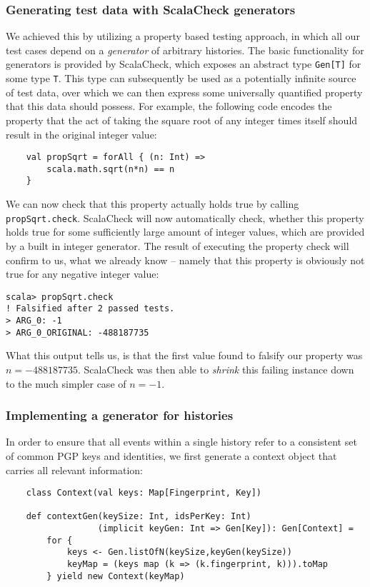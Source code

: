 \subsubsection{Generating test data with ScalaCheck generators}
We achieved this by utilizing a property based testing approach, in which all our test cases depend on a \emph{generator} of arbitrary histories. The basic functionality for generators is provided by ScalaCheck, which exposes an abstract type \texttt{Gen[T]} for some type \texttt{T}. This type can subsequently be used as a potentially infinite source of test data, over which we can then express some universally quantified property that this data should possess.
For example, the following code encodes the property that the act of taking the square root of any integer times itself should result in the original integer value: 
\begin{verbatim}
    val propSqrt = forAll { (n: Int) => 
        scala.math.sqrt(n*n) == n 
    }
\end{verbatim}

We can now check that this property actually holds true by calling \texttt{propSqrt.check}. 
ScalaCheck will now automatically check, whether this property holds true for some sufficiently large amount of integer values, which are provided by a built in integer generator. The result of executing the property check will confirm to us, what we already know -- namely that this property is obviously not true for any negative integer value: 
\begin{verbatim}
scala> propSqrt.check
! Falsified after 2 passed tests.
> ARG_0: -1
> ARG_0_ORIGINAL: -488187735
\end{verbatim} 
What this output tells us, is that the first value found to falsify our property was \(n=-488187735\). ScalaCheck was then able to \emph{shrink} this failing instance down to the much simpler case of \(n=-1\).

\subsubsection{Implementing a generator for histories}
In order to ensure that all events within a single history refer to a consistent set of common PGP keys and identities, we first generate a context object that carries all relevant information: 

\begin{verbatim}
    class Context(val keys: Map[Fingerprint, Key])

    def contextGen(keySize: Int, idsPerKey: Int)
                  (implicit keyGen: Int => Gen[Key]): Gen[Context] = 
        for {
            keys <- Gen.listOfN(keySize,keyGen(keySize))
            keyMap = (keys map (k => (k.fingerprint, k))).toMap
        } yield new Context(keyMap)
\end{verbatim}

